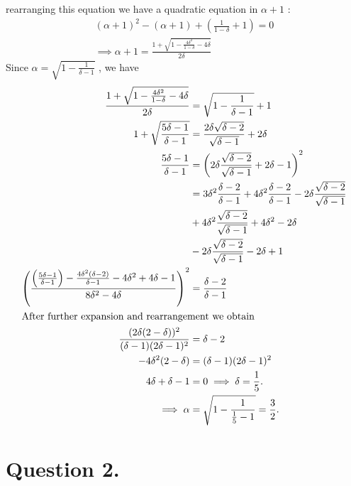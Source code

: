 \documentclass[
	12pt,
	]{article}
\theoremstyle{definition}
\theoremstyle{definition}
\theoremstyle{definition}
\theoremstyle{definition}
\theoremstyle{definition}
\theoremstyle{example}
\theoremstyle{note}
\theoremstyle{remark}
\theoremstyle{example}
\begin{document}
		rearranging this equation we have a quadratic equation in $\alpha +1$ : 
		\begin{gather*}
			(\alpha+1)^{2} - (\alpha+1) +\left(\frac{1}{1-\delta} +1\right) =0 \\
			\implies \alpha +1 = \frac{1 + \sqrt{1-\frac{4\delta^{2}}{1-\delta} -4\delta}}{2\delta}
		\end{gather*}
		Since $\alpha = \sqrt{1-\frac{1}{\delta -1}}$ , we have
		\begin{align*}
			\frac{1 + \sqrt{1-\frac{4\delta^{2}}{1-\delta} -4\delta}}{2\delta} &= \sqrt{1-\frac{1}{\delta -1}} +1 \\
			1 + \sqrt{\frac{5\delta -1 }{\delta-1}} &= \frac{2\delta \sqrt{\delta-2}}{\sqrt{\delta-1}} + 2\delta \\
			\frac{5\delta -1}{\delta -1} &= \left(2\delta\frac{\sqrt{\delta-2}}{\sqrt{\delta-1}} +2\delta -1\right)^{2} \\
				&= 3\delta^{2}\frac{\delta-2}{\delta-1} + 4\delta^{2}\frac{\delta-2}{\delta-1} -2\delta\frac{\sqrt{\delta-2}}{\sqrt{\delta-1}}\\ &+4\delta^{2}\frac{\sqrt{\delta-2}}{\sqrt{\delta-1}} +4\delta^{2} -2\delta \\ &-2\delta\frac{\sqrt{\delta-2}}{\sqrt{\delta-1}} -2\delta +1 \\
				\left(\frac{\left(\frac{5\delta-1}{\delta-1}\right) - \frac{4\delta^{2}(\delta-2)}{\delta-1}  -4\delta^{2}+4\delta-1}{8\delta^{2}-4\delta}\right)^{2} &= \frac{\delta-2}{\delta-1}\\
				\intertext{After further expansion and rearrangement we obtain } 
				\frac{(2\delta (2-\delta))^{2}}{(\delta-1)(2\delta-1)^{2}} &= \delta -2 \\
				-4\delta^{2}(2-\delta) &= (\delta-1)(2\delta-1)^{2} \\
				4\delta + \delta -1 &= 0  \implies \delta = \frac15 .\\
				\implies \alpha &= \sqrt{1 - \frac{1}{\frac15 - 1}} = \frac32.
		\end{align*}
		\section{Question 2.}
\end{document}
